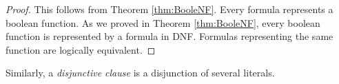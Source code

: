 

\setcounter{section}{1}
\setcounter{subsection}{5}
\setcounter{dfn}{17}

\begin{proof}
This follows from Theorem \ref{thm:BooleNF}.
Every formula represents a boolean function.
As we proved in Theorem \ref{thm:BooleNF}, every boolean function is represented by a formula in DNF.
Formulas representing the same function are logically equivalent.
\end{proof}

Similarly, a \emph{disjunctive clause} is a disjunction of several literals.

